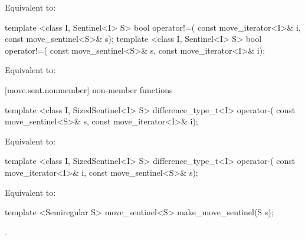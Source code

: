 \begin{itemdescr}
\pnum
\effects Equivalent to: 
\end{itemdescr}

%
%
\begin{itemdecl}
template <class I, Sentinel<I> S>
  bool operator!=(
    const move_iterator<I>& i, const move_sentinel<S>& s);
template <class I, Sentinel<I> S>
  bool operator!=(
    const move_sentinel<S>& s, const move_iterator<I>& i);
\end{itemdecl}

\begin{itemdescr}
\pnum
\effects Equivalent to: 
\end{itemdescr}

[move.sent.nonmember]{ non-member functions}

%
%
\begin{itemdecl}
template <class I, SizedSentinel<I> S>
  difference_type_t<I> operator-(
    const move_sentinel<S>& s, const move_iterator<I>& i);
\end{itemdecl}

\begin{itemdescr}
\pnum
\effects Equivalent to: 
\end{itemdescr}

\begin{itemdecl}
template <class I, SizedSentinel<I> S>
  difference_type_t<I> operator-(
    const move_iterator<I>& i, const move_sentinel<S>& s);
\end{itemdecl}

\begin{itemdescr}
\pnum
\effects Equivalent to: 
\end{itemdescr}

%
\begin{itemdecl}
template <Semiregular S>
  move_sentinel<S> make_move_sentinel(S s);
\end{itemdecl}

\begin{itemdescr}
\pnum
\returns {}.
\end{itemdescr}

